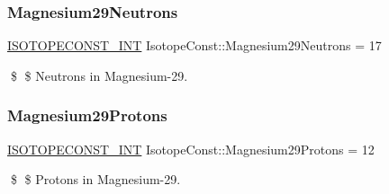 \subsubsection{\texorpdfstring{Magnesium29\+Neutrons}{Magnesium29Neutrons}}
{\footnotesize\ttfamily \mbox{\hyperlink{group___isotope_const-_macros_ga5f18360b3e99483a35c32d789e62621c}{I\+S\+O\+T\+O\+P\+E\+C\+O\+N\+S\+T\+\_\+\+I\+NT}} Isotope\+Const\+::\+Magnesium29\+Neutrons = 17}

\$ \$ Neutrons in Magnesium-\/29. \mbox{\label{group___isotope_const-_magnesium-_mg29_gab578b50edf140a16df6a337fd8ad60c1}} 
\subsubsection{\texorpdfstring{Magnesium29\+Protons}{Magnesium29Protons}}
{\footnotesize\ttfamily \mbox{\hyperlink{group___isotope_const-_macros_ga5f18360b3e99483a35c32d789e62621c}{I\+S\+O\+T\+O\+P\+E\+C\+O\+N\+S\+T\+\_\+\+I\+NT}} Isotope\+Const\+::\+Magnesium29\+Protons = 12}

\$ \$ Protons in Magnesium-\/29. 